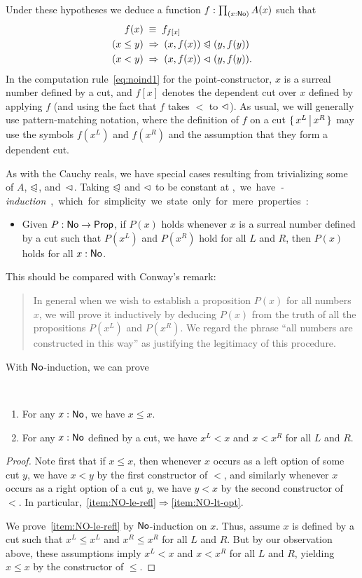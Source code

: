 Under these hypotheses we deduce a function $f:\prd{x:\NO} A(x)$ such that
\begin{align}
  f(x) &\;\jdeq\; f_{f[x]} \label{eq:noind1}\\
  (x\le y) &\;\Rightarrow\; (x,f(x)) \ble (y,f(y)) \notag\\
  (x< y) &\;\Rightarrow\; (x,f(x)) \blt (y,f(y)). \notag
\end{align}
In the computation rule~\eqref{eq:noind1} for the point-constructor, $x$ is a surreal number defined by a cut, and $f[x]$ denotes the dependent cut over $x$ defined by applying $f$ (and using the fact that $f$ takes $<$ to $\vartriangleleft$).
As usual, we will generally use pattern-matching notation, where the definition of $f$ on a cut $\{\,x^L\,\big|\,x^R\,\}$ may use the symbols $f(x^L)$ and $f(x^R)$ and the assumption that they form a dependent cut.

As with the Cauchy reals, we have special cases resulting from trivializing some of $A$, $\trianglelefteqslant$, and~$\vartriangleleft$.
Taking $\trianglelefteqslant$ and $\vartriangleleft$ to be constant at \unit, we have \emph{\NO-induction}, which for simplicity we state only for mere properties:
\begin{itemize}
\item Given $P:\mathsf{No}\to\mathsf{Prop}$, if $P(x)$ holds whenever $x$ is a surreal number defined by a cut such that $P(x^L)$ and $P(x^R)$ hold for all
$L$ and $R$, then $P(x)$ holds for all $x:\mathsf{No}$.
\end{itemize}
This should be compared with Conway's remark:
\begin{quote}\footnotesize
  In general when we wish to establish a proposition $P(x)$ for all numbers $x$, we will prove it inductively by deducing $P(x)$ from the truth of all the propositions $P(x^L)$ and $P(x^R)$.
  We regard the phrase ``all numbers are constructed in this way'' as justifying the legitimacy of this procedure.
\end{quote}
With $\mathsf{No}$-induction, we can prove

\begin{thm}\label{thm:NO-refl-opt}\ 
  \begin{enumerate}
  \item For any $x:\mathsf{No}$, we have $x\le x$.\label{item:NO-le-refl}
  \item For any $x:\mathsf{No}$ defined by a cut, we have $x^L <x$ and $x<x^R$ for all $L$ and $R$.\label{item:NO-lt-opt}
  \end{enumerate}
\end{thm}
\begin{proof}
  Note first that if $x\le x$, then whenever $x$ occurs as a left option of some cut $y$, we have $x<y$ by the first constructor of $<$, and similarly whenever $x$ occurs as a right option of a cut $y$, we have $y<x$ by the second constructor of $<$.
  In particular,~\ref{item:NO-le-refl}$\Rightarrow$\ref{item:NO-lt-opt}.

  We prove~\ref{item:NO-le-refl} by $\mathsf{No}$-induction on $x$.
  Thus, assume $x$ is defined by a cut such that $x^L\le x^L$ and $x^R \le x^R$ for all $L$ and $R$.
  But by our observation above, these assumptions imply $x^L<x$ and $x<x^R$ for all $L$ and $R$, yielding $x\le x$ by the constructor of $\le$.
\end{proof}

